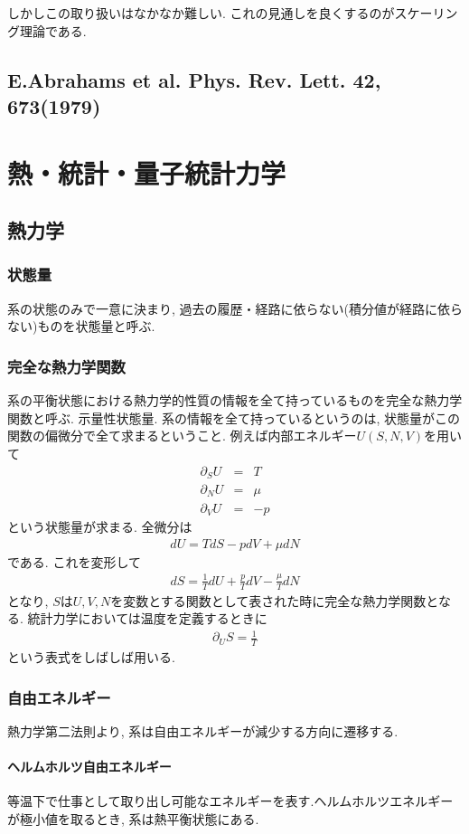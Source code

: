 \documentclass[10.5pt,a4paper]{jreport}
\begin{document}
しかしこの取り扱いはなかなか難しい. これの見通しを良くするのがスケーリング理論である.
\section{E.Abrahams et al. Phys. Rev. Lett. $\bm{42}$, 673(1979)}
\newpage
\chapter{熱・統計・量子統計力学}
\section{熱力学}
\subsection{状態量}
系の状態のみで一意に決まり, 過去の履歴・経路に依らない(積分値が経路に依らない)ものを状態量と呼ぶ. 
\subsection{完全な熱力学関数}
系の平衡状態における熱力学的性質の情報を全て持っているものを完全な熱力学関数と呼ぶ. 示量性状態量. 系の情報を全て持っているというのは, 状態量がこの関数の偏微分で全て求まるということ. 例えば内部エネルギー$U(S, N, V)$を用いて
\begin{eqnarray}
  \partial_SU &=& T\\
  \partial_NU &=& \mu\\
  \partial_VU &=& -p
\end{eqnarray}
という状態量が求まる. 全微分は
\begin{eqnarray}
  dU = TdS -pdV + \mu dN
\end{eqnarray}
である. これを変形して
\begin{eqnarray}
  dS = \frac{1}{T}dU +\frac{p}{T}dV - \frac{\mu}{T} dN
\end{eqnarray}
となり, $S$は$U, V, N$を変数とする関数として表された時に完全な熱力学関数となる. 統計力学においては温度を定義するときに
\begin{eqnarray}
  \partial_US = \frac{1}{T}
\end{eqnarray}
という表式をしばしば用いる.
\subsection{自由エネルギー}
熱力学第二法則より, 系は自由エネルギーが減少する方向に遷移する. 
\subsubsection{ヘルムホルツ自由エネルギー}
等温下で仕事として取り出し可能なエネルギーを表す.ヘルムホルツエネルギーが極小値を取るとき, 系は熱平衡状態にある.
\end{document}
